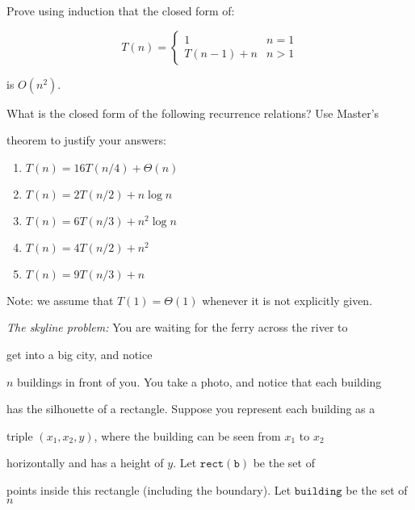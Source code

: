 \documentclass{article}
\begin{document}
\nextprob

Prove using induction that the closed form of:

$$T(n) = \begin{cases}

            1        & n=1\\

            T(n-1)+n & n>1

         \end{cases}

$$

is $O(n^2)$.



\nextprob

What is the closed form of the following recurrence relations?  Use Master's

theorem to justify your answers:

\begin{enumerate}

    \item $T(n) = 16 T(n/4) + \Theta(n)$

    \item $T(n) = 2 T(n/2) + n \log{n}$

    \item $T(n) = 6 T(n/3) + n^2 \log{n}$

    \item $T(n) = 4 T(n/2) + n^2$

    \item $T(n) = 9 T(n/3) + n$

\end{enumerate}

Note: we assume that $T(1)=\Theta(1)$ whenever it is not explicitly given.



\nextprob

\emph{The skyline problem:} You are waiting for the ferry across the river to

get into a big city, and notice

$n$ buildings in front of you.  You take a photo, and notice that each building

has the silhouette of a rectangle.  Suppose you  represent each building as a

triple $(x_1,x_2,y)$, where the building can be seen from $x_1$ to $x_2$

horizontally and has a height of $y$.  Let $\mathtt{rect(b)}$ be the set of

points inside this rectangle (including the boundary).  Let $\mathtt{building}$ be the set of $n$
\end{document}
